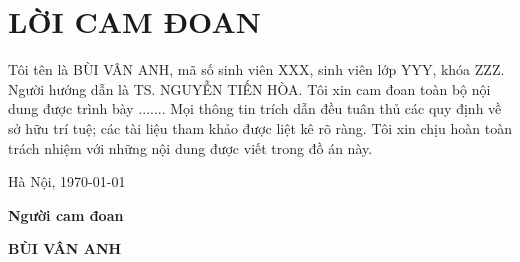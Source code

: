 \section*{LỜI CAM ĐOAN}
\thispagestyle{empty}
Tôi tên là BÙI VÂN ANH, mã số sinh viên XXX, sinh viên lớp YYY, khóa ZZZ. Người hướng dẫn là TS. NGUYỄN TIẾN HÒA. Tôi xin cam đoan toàn bộ nội dung được trình bày ....... Mọi thông tin trích dẫn đều tuân thủ các quy định về sở hữu trí tuệ; các tài liệu tham khảo được liệt kê rõ ràng. Tôi xin chịu hoàn toàn trách nhiệm với những nội dung được viết trong đồ án này.

\vspace{6pt}
\hspace{8.3cm}Hà Nội, \today

\hspace{9cm}\textbf{Người cam đoan}

\vspace{2cm}
\hspace{9.25cm}\textbf{BÙI VÂN ANH}
\cleardoublepage